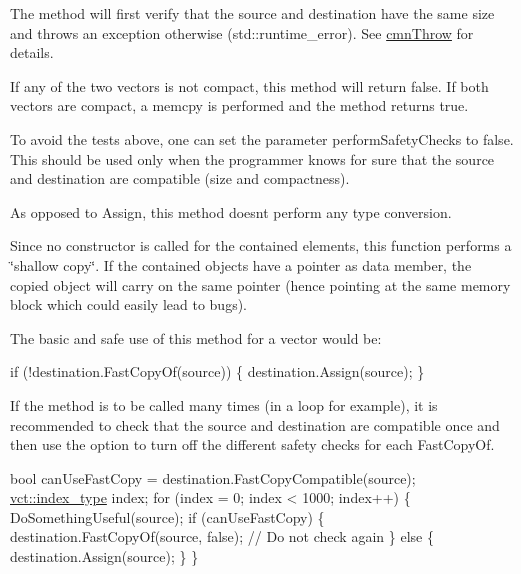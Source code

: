 \begin{DoxyItemize}
\item The method will first verify that the source and destination have the same size and throws an exception otherwise ({\ttfamily std\+::runtime\+\_\+error}). See \hyperlink{cmn_throw_8h_a6fe29a0b6f112fe0032896bb904f8377}{cmn\+Throw} for details.
\item If any of the two vectors is not compact, this method will return {\ttfamily false}. If both vectors are compact, a {\ttfamily memcpy} is performed and the method returns {\ttfamily true}.
\item To avoid the tests above, one can set the parameter {\ttfamily perform\+Safety\+Checks} to {\ttfamily false}. This should be used only when the programmer knows for sure that the source and destination are compatible (size and compactness).
\item As opposed to Assign, this method doesn\textquotesingle{}t perform any type conversion.
\item Since no constructor is called for the contained elements, this function performs a \char`\"{}shallow copy\char`\"{}. If the contained objects have a pointer as data member, the copied object will carry on the same pointer (hence pointing at the same memory block which could easily lead to bugs).
\end{DoxyItemize}

The basic and safe use of this method for a vector would be\+: 
\begin{DoxyCode}
\textcolor{keywordflow}{if} (!destination.FastCopyOf(source)) \{
    destination.Assign(source);
\}
\end{DoxyCode}


If the method is to be called many times (in a loop for example), it is recommended to check that the source and destination are compatible once and then use the option to turn off the different safety checks for each Fast\+Copy\+Of. 
\begin{DoxyCode}
\textcolor{keywordtype}{bool} canUseFastCopy = destination.FastCopyCompatible(source);
\hyperlink{namespacevct_a50405d87494dce1f22ee3930ca285ee9}{vct::index\_type} index;
\textcolor{keywordflow}{for} (index = 0; index < 1000; index++) \{
    DoSomethingUseful(source);
    \textcolor{keywordflow}{if} (canUseFastCopy) \{
        destination.FastCopyOf(source, \textcolor{keyword}{false}); \textcolor{comment}{// Do not check again}
    \} \textcolor{keywordflow}{else} \{
        destination.Assign(source);
    \}
\}
\end{DoxyCode}




